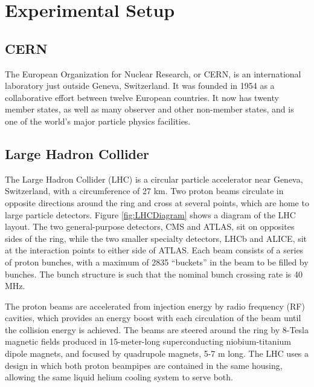 \chapter{Experimental Setup}
\label{exp}

\section{CERN}
\label{exp:CERN}
The European Organization for Nuclear Research, or CERN, is an
international laboratory just outside Geneva, Switzerland.  
It was founded in 1954 as a collaborative effort between twelve European 
countries.  
It now has twenty member states, as well as many observer 
and other non-member states, and is one of the world's major 
particle physics facilities.  

\section{Large Hadron Collider}
\label{exp:LHC}



The Large Hadron Collider (LHC) \cite{LhcMachine}
is a circular particle accelerator near Geneva, Switzerland, 
with a circumference of 27 km. 
Two proton beams circulate in opposite directions around the ring
and cross at several points, which are home to large particle detectors.  
Figure \ref{fig:LHCDiagram} shows a diagram of the LHC layout.  
The two general-purpose detectors, CMS and ATLAS, sit on opposites sides of the ring, 
while the two smaller specialty detectors, LHCb and ALICE, 
sit at the interaction points to either side of ATLAS.  
Each beam consists of a series of proton bunches, 
with a maximum of 2835 ``buckets'' in the beam to be filled by bunches.  
The bunch structure is such that the nominal bunch crossing rate is 40 MHz.  

The proton beams are accelerated from injection energy by %
radio frequency (RF) cavities, %
which provides an energy boost with each circulation of the beam
until the collision energy is achieved.  
The beams are steered around the ring by 8-Tesla magnetic fields produced in 
15-meter-long superconducting niobium-titanium dipole magnets,
and focused by quadrupole magnets, 5-7 m long.  
The LHC uses a design in which both proton beampipes are contained in the same housing,
allowing the same liquid helium cooling system to serve both.  

